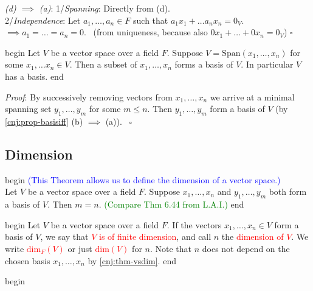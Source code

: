 \documentclass[
  12pt,
  a4paper,
  twoside]{article}
\theoremstyle{plain}
\theoremstyle{definition}
\begin{document}
\emph{(d) \(\implies\) (a)}: 1/\emph{Spanning}: Directly from (d).\\
2/\emph{Independence}: Let \(a_1, \dots, a_n \in F\) such that \(a_1x_1 + \dots a_nx_n = 0_{V}\).\\
\(\implies a_1 = \dots = a_n = 0\). \hfill~{(from uniqueness, because also \(0x_1 + \dots + 0x_n = 0_{V}\)) \(\square\)}

\csname begin\label{cnj:coro-basis-exists}
Let \(V\) be a vector space over a field \(F\).
Suppose \(V = \mathrm{Span}(x_1, \dots, x_n)\) for some \(x_1, \dots x_n \in V\).
Then a subset of \(x_1, \dots, x_n\) forms a basis of \(V\). In particular \(V\) has a basis.
\csname end

\emph{Proof}:
By successively removing vectors from \(x_1, \dots, x_n\) we arrive at a minimal spanning set \(y_1, \dots, y_m\)
for some \(m \leq n\). Then \(y_1, \dots, y_m\) form a basis of \(V\) (by \ref{cnj:prop-basisiff} (b) \(\implies\) (a)).
\hfill~{\(\square\)}

\hypertarget{ss-dimension}{%
\subsection{Dimension}\label{ss-dimension}}

\csname begin\label{cnj:thm-vsdim}
\textcolor{blue}{(This Theorem allows us to define the dimension of a vector space.)}\\
Let \(V\) be a vector space over a field \(F\).
Suppose \(x_1, \dots, x_n\) and \(y_1, \dots, y_m\) both form a basis of \(V\). Then \(m = n\).
\textcolor{green}{(Compare Thm 6.44 from L.A.I.)}
\csname end

\csname begin\label{cnj:defn-vsdim}
Let \(V\) be a vector space over a field \(F\).
If the vectors \(x_1, \dots, x_n \in V\) form a basis of \(V\), we say that \textcolor{red}{$V$ is of finite dimension},
and call \(n\) the \textcolor{red}{dimension of $V$}. We write \textcolor{red}{$\mathrm{dim}_{F}(V)$}
or just \textcolor{red}{$\mathrm{dim}(V)$} for \(n\).
Note that \(n\) does not depend on the chosen basis \(x_1, \dots, x_n\) by \ref{cnj:thm-vsdim}.
\csname end

\csname begin\label{cnj:expl-vsdim1}
\end{document}
